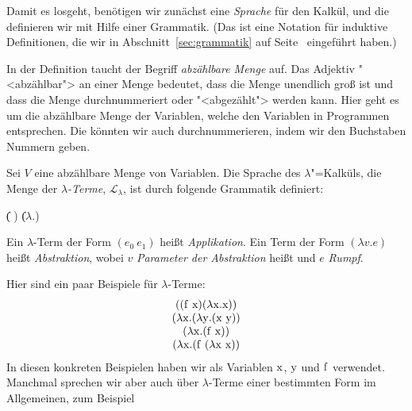 Damit es losgeht, benötigen wir zunächst eine \textit{Sprache} für den
Kalkül, und die definieren wir mit Hilfe einer Grammatik.  (Das ist
eine Notation für induktive Definitionen, die wir in
Abschnitt~\ref{sec:grammatik} auf Seite~\pageref{sec:grammatik}
eingeführt haben.)

In der Definition taucht der Begriff \textit{abzählbare
  Menge} auf.  Das Adjektiv "<abzählbar"> an
einer Menge bedeutet, dass die Menge unendlich groß ist und dass die
Menge durchnummeriert oder "<abgezählt"> werden kann.  Hier geht es um
die abzählbare Menge der Variablen, welche den Variablen in Programmen
entsprechen.  Die könnten wir auch durchnummerieren, indem wir den
Buchstaben Nummern geben.

\begin{definition}
  
  Sei $V$ eine abzählbare Menge von Variablen. 
  Die Sprache des $\lambda$"=Kalküls, die Menge der
  \textit{$\lambda$-Terme},
  $\mathcal{L}_{\lambda}$, ist
  durch folgende Grammatik definiert:
  \begin{grammar}
     \: 
    \> \| ( )
    \> \| ($\lambda$.)
  \end{grammar}
%
  Ein $\lambda$-Term der Form $(e_0~e_1)$ heißt
  \textit{Applikation}. Ein Term der Form
  $(\lambda v.e)$ heißt \textit{Abstraktion}, wobei
  $v$ \textit{Parameter der Abstraktion} heißt und
  $e$ \textit{Rumpf}.
\end{definition}
%
Hier sind ein paar Beispiele für $\lambda$-Terme:
%
\begin{displaymath}
  \begin{array}{c}
    ((\mathrm f~\mathrm x)
    (\lambda \mathrm x.\mathrm x))\\
    (\lambda \mathrm x.(\lambda \mathrm y.(\mathrm x~\mathrm y))\\
    (\lambda \mathrm x.(\mathrm f~\mathrm x))\\
    (\lambda \mathrm x.(\mathrm f~(\lambda \mathrm x~\mathrm x))
  \end{array}
\end{displaymath}
% 
In diesen konkreten Beispielen haben wir als Variablen $\mathrm x$, $\mathrm y$ und
$\mathrm f$ verwendet.  Manchmal sprechen wir aber auch über
$\lambda$-Terme einer bestimmten Form im Allgemeinen, zum Beispiel
